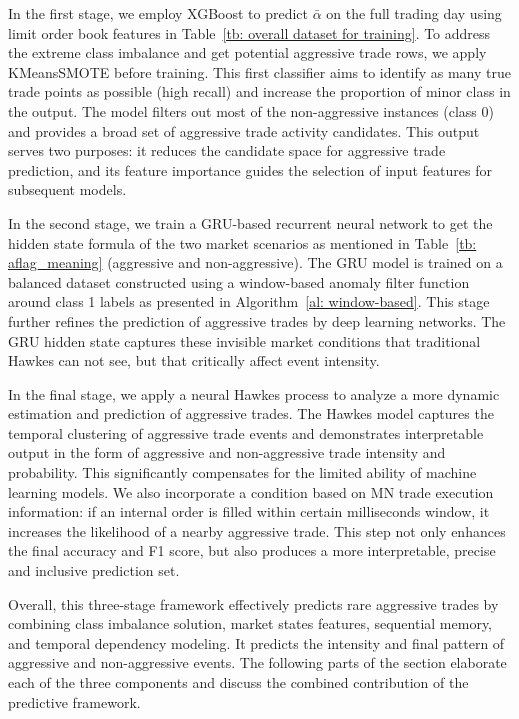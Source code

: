 In the first stage, we employ XGBoost to predict $\bar{\alpha}$ on the full trading day using limit order book features in Table~\ref{tb: overall dataset for training}. To address the extreme class imbalance and get potential aggressive trade rows, we apply KMeansSMOTE before training. This first classifier aims to identify as many true trade points as possible (high recall) and increase the proportion of minor class in the output. The model filters out most of the non-aggressive instances (class 0) and provides a broad set of aggressive trade activity candidates. This output serves two purposes: it reduces the candidate space for aggressive trade prediction, and its feature importance guides the selection of input features for subsequent models.

In the second stage, we train a GRU-based recurrent neural network to get the hidden state formula of the two market scenarios as mentioned in Table~\ref{tb: aflag_meaning} (aggressive and non-aggressive). The GRU model is trained on a balanced dataset constructed using a window-based anomaly filter function around class 1 labels as presented in Algorithm~\ref{al: window-based}. This stage further refines the prediction of aggressive trades by deep learning networks. The GRU hidden state captures these invisible market conditions that traditional Hawkes can not see, but that critically affect event intensity.

In the final stage, we apply a neural Hawkes process to analyze a more dynamic estimation and prediction of aggressive trades. The Hawkes model captures the temporal clustering of aggressive trade events and demonstrates interpretable output in the form of aggressive and non-aggressive trade intensity and probability. This significantly compensates for the limited ability of machine learning models. We also incorporate a condition based on MN trade execution information: if an internal order is filled within certain milliseconds window, it increases the likelihood of a nearby aggressive trade. This step not only enhances the final accuracy and F1 score, but also produces a more interpretable, precise and inclusive prediction set.

Overall, this three-stage framework effectively predicts rare aggressive trades by combining class imbalance solution, market states features, sequential memory, and temporal dependency modeling. It predicts the intensity and final pattern of aggressive and non-aggressive events. The following parts of the section elaborate each of the three components and discuss the combined contribution of the predictive framework.

